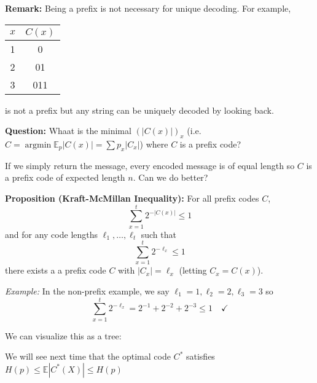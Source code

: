\documentclass[12pt]{article}
\newcommand{\E}{\mathbb{E}}
\newcommand{\abs}[1]{\left\vert #1 \right\vert}
\newcommand*{\tbf}[1]{\ifmmode\mathbf{#1}\else\textbf{#1}\fi}
\DeclareMathOperator*{\argmin}{\arg\min}
\newenvironment*{proposition}[1][gray]{
\begin{tcolorbox}[
    parbox=false,
    colback=#1!5!white,
    colframe=#1!75!black,
    breakable
]}
{\end{tcolorbox}}
\begin{document}
\tbf{Remark:} Being a prefix is not necessary for unique decoding. For example,

\qquad \begin{tabular}{c|c}
    $x$ & $C(x)$ \\ \hline
    1   & 0      \\
    2   & 01     \\
    3   & 011    \\ \hline
\end{tabular}

is not a prefix but any string can be uniquely decoded by looking back.

\tbf{Question:} Whaat is the minimal $(\abs{C(x)})_x$ (i.e. $C = \argmin \E_p \abs{C(x)} = \sum p_x \abs{C_x}$) where $C$ is a prefix code?

If we simply return the message, every encoded message is of equal length so $C$ is a prefix code of expected length $n$. Can we do better?

\begin{proposition}
    \textbf{Proposition (Kraft-McMillan Inequality):} For all prefix codes $C$,
    \[\sum_{x=1}^t 2^{-\abs{C(x)}} \leq 1\]
    and for any code lengths $\ell_1, \dots, \ell_t$ such that
    \[\sum_{x=1}^t 2^{-\ell_x} \leq 1\]
    there exists a a prefix code $C$ with $\abs{C_x} = \ell_x$ (letting $C_x = C(x)$).
\end{proposition}

\emph{Example:} In the non-prefix example, we say $\ell_1 = 1, \ell_2 = 2, \ell_3 = 3$ so
\[\sum_{x=1}^t 2^{-\ell_x} = 2^{-1} + 2^{-2} + 2^{-3} \leq 1\quad \checkmark \]

We can visualize this as a tree:
\begin{center}
\end{center}


We will see next time that the optimal code $C^*$ satisfies $H(p) \leq \E\abs{C^*(X)} \leq H(p)$
\end{document}
